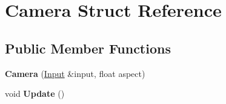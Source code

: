 \hypertarget{structCamera}{}\section{Camera Struct Reference}
\label{structCamera}
\subsection*{Public Member Functions}
\begin{DoxyCompactItemize}
\item 
\mbox{\label{structCamera_ae8698e8f0bc5cec23053acd2b1bb8ba7}} 
{\bfseries Camera} (\mbox{\hyperlink{classInput}{Input}} \&input, float aspect)
\item 
\mbox{\label{structCamera_a4a596a3ea1fdc7d244ba4268031a360b}} 
void {\bfseries Update} ()
\end{DoxyCompactItemize}
